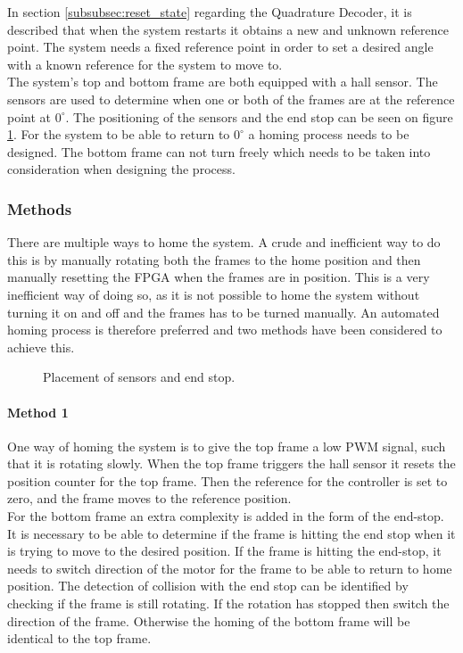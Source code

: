 \documentclass[../../../main]{subfiles}
\begin{document}
In section \ref{subsubsec:reset_state} regarding the Quadrature Decoder, it is described that when the system restarts it obtains a new and unknown reference point.
The system needs a fixed reference point in order to set a desired angle with a known reference for the system to move to. \\
The system's top and bottom frame are both equipped with a hall sensor.
The sensors are used to determine when one or both of the frames are at the reference point at $0^\circ$. The positioning of the sensors and the end stop can be seen on figure \ref{fig:homing_system}.
For the system to be able to return to $0^\circ$ a homing process needs to be designed.
The bottom frame can not turn freely which needs to be taken into consideration when designing the process.
\subsubsection{Methods}
There are multiple ways to home the system. A crude and inefficient way to do this is by manually rotating both the frames to the home position and then manually resetting the FPGA when the frames are in position.
This is a very inefficient way of doing so, as it is not possible to home the system without turning it on and off and the frames has to be turned manually.
An automated homing process is therefore preferred and two methods have been considered to achieve this.

\begin{figure}[H]
  \centering
  \def\svgwidth{\textwidth}
  
  \caption{Placement of sensors and end stop.}
  \label{fig:homing_system}
\end{figure}
\paragraph{Method 1}%
\label{par:method_1}
One way of homing the system is to give the top frame a low PWM signal, such that it is rotating slowly.
When the top frame triggers the hall sensor it resets the position counter for the top frame.
Then the reference for the controller is set to zero, and the frame moves to the reference position.
\\
For the bottom frame an extra complexity is added in the form of the end-stop. It is necessary to be able to determine if the frame is hitting the end stop when it is trying to move to the desired position.
If the frame is hitting the end-stop, it needs to switch direction of the motor for the frame to be able to return to home position.
The detection of collision with the end stop can be identified by checking if the frame is still rotating. If the rotation has stopped then switch the direction of the frame.
Otherwise the homing of the bottom frame will be identical to the top frame.
\end{document}
